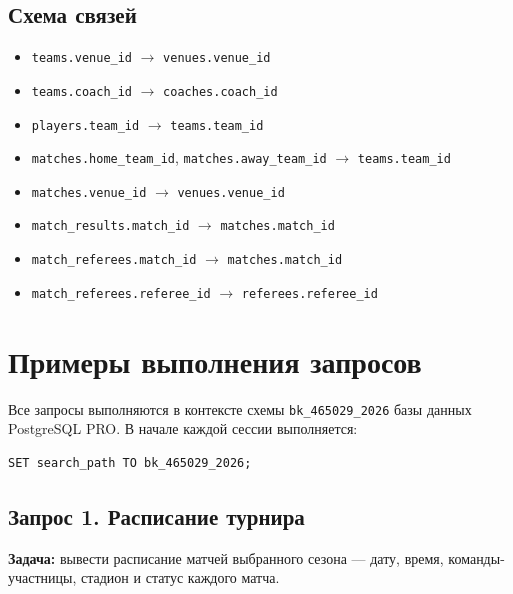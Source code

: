 \documentclass[14pt,a4paper]{extarticle}
\begin{document}
\subsection{Схема связей}

\begin{itemize}
  \item \texttt{teams.venue\_id} $\rightarrow$ \texttt{venues.venue\_id}
  \item \texttt{teams.coach\_id} $\rightarrow$ \texttt{coaches.coach\_id}
  \item \texttt{players.team\_id} $\rightarrow$ \texttt{teams.team\_id}
  \item \texttt{matches.home\_team\_id}, \texttt{matches.away\_team\_id} $\rightarrow$ \texttt{teams.team\_id}
  \item \texttt{matches.venue\_id} $\rightarrow$ \texttt{venues.venue\_id}
  \item \texttt{match\_results.match\_id} $\rightarrow$ \texttt{matches.match\_id}
  \item \texttt{match\_referees.match\_id} $\rightarrow$ \texttt{matches.match\_id}
  \item \texttt{match\_referees.referee\_id} $\rightarrow$ \texttt{referees.referee\_id}
\end{itemize}

\section{Примеры выполнения запросов}

Все запросы выполняются в контексте схемы \texttt{bk\_465029\_2026} базы данных
PostgreSQL PRO. В начале каждой сессии выполняется:
\begin{verbatim}
SET search_path TO bk_465029_2026;
\end{verbatim}

\subsection{Запрос 1. Расписание турнира}

\textbf{Задача:} вывести расписание матчей выбранного сезона — дату, время,
команды-участницы, стадион и статус каждого матча.
\end{document}
